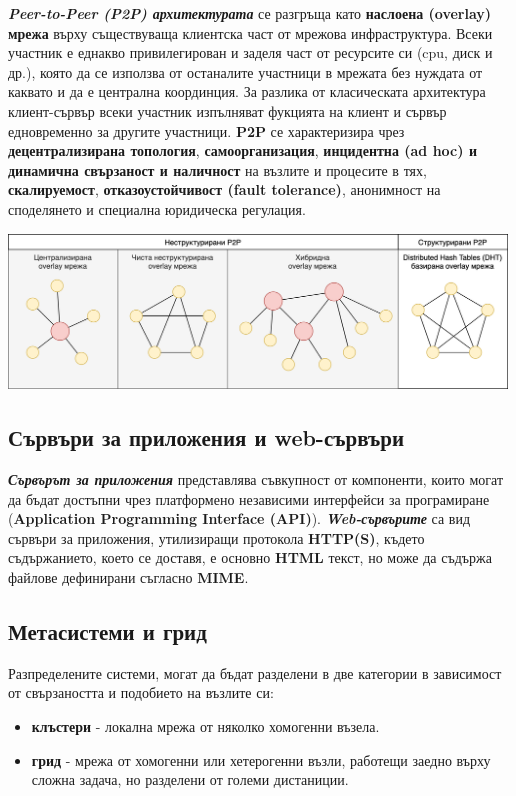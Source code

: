 \documentclass[fleqn,12pt]{article}
\begin{document}
\textbf{\textit{Peer-to-Peer (P2P) архитектурата}} се разгръща като \textbf{наслоена (overlay) мрежа} върху съществуваща клиентска част от мрежова инфраструктура.
Всеки участник е еднакво привилегирован и заделя част от ресурсите си (cpu, диск и др.), която да се използва от останалите участници в мрежата без нуждата от каквато и да е централна координция.
За разлика от класическата архитектура клиент-сървър всеки участник изпълняват фукцията на клиент и сървър едновременно за другите участници.
\textbf{P2P} се характеризира чрез \textbf{децентрализирана топология}, \textbf{самоорганизация}, \textbf{инцидентна (ad hoc) и динамична свързаност и наличност} на възлите и процесите в тях, \textbf{скалируемост}, \textbf{отказоустойчивост (fault tolerance)}, анонимност на споделянето и специална юридическа регулация.

\begin{center} \includegraphics[width=500px]{p2p_overlay_topologies.png} \end{center}

\subsection{Сървъри за приложения и web-сървъри}

\textbf{\textit{Сървърът за приложения}} представлява съвкупност от компоненти, които могат да бъдат достъпни чрез платформено независими интерфейси за програмиране (\textbf{Application Programming Interface (API)}).
\textbf{\textit{Web-сървърите}} са вид сървъри за приложения, утилизиращи протокола \textbf{HTTP(S)}, където съдържанието, което се доставя, е основно \textbf{HTML} текст, но може да съдържа файлове дефинирани съгласно \textbf{MIME}.

\subsection{Метасистеми и грид}

Разпределените системи, могат да бъдат разделени в две категории в зависимост от свързаността и подобието на възлите си:
\begin{itemize}
    \item \textbf{клъстери} - локална мрежа от няколко хомогенни възела.
    \item \textbf{грид} - мрежа от хомогенни или хетерогенни възли, работещи заедно върху сложна задача, но разделени от големи дистаниции.
\end{itemize}
\end{document}
